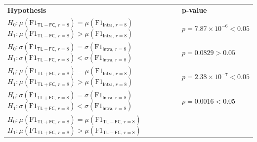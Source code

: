 \begin{table}[t]
\begin{tabularx}{\linewidth}{|X|l|}
  \Xhline{2\arrayrulewidth}
  \textbf{Hypothesis} & \textbf{p-value} \\
  \Xhline{1\arrayrulewidth}
  \( H_0: \mu\left(\text{F1}_{\mathsf{TL{-}FC},\, r=8}\right) = \mu\left(\text{F1}_{\mathsf{Intra},\, r=8}\right) \) \newline
  \( H_1: \mu\left(\text{F1}_{\mathsf{TL{-}FC},\, r=8}\right) > \mu\left(\text{F1}_{\mathsf{Intra},\, r=8}\right) \)
  & $p = 7.87 \times 10^{-6} < 0.05$ \\
  \hline
  \( H_0: \sigma\left(\text{F1}_{\mathsf{TL{-}FC},\, r=8}\right) = \sigma\left(\text{F1}_{\mathsf{Intra},\, r=8}\right) \) \newline
  \( H_1: \sigma\left(\text{F1}_{\mathsf{TL{-}FC},\, r=8}\right) < \sigma\left(\text{F1}_{\mathsf{Intra},\, r=8}\right) \)
  & $p = 0.0829 > 0.05$ \\
  \Xhline{1.8\arrayrulewidth}
  \( H_0: \mu\left(\text{F1}_{\mathsf{TL{+}FC},\, r=8}\right) = \mu\left(\text{F1}_{\mathsf{Intra},\, r=8}\right) \) \newline
  \( H_1: \mu\left(\text{F1}_{\mathsf{TL{+}FC},\, r=8}\right) > \mu\left(\text{F1}_{\mathsf{Intra},\, r=8}\right) \)
  & $p = 2.38 \times 10^{-7} < 0.05$ \\
  \hline
  \( H_0: \sigma\left(\text{F1}_{\mathsf{TL{+}FC},\, r=8}\right) = \sigma\left(\text{F1}_{\mathsf{Intra},\, r=8}\right) \) \newline
  \( H_1: \sigma\left(\text{F1}_{\mathsf{TL{+}FC},\, r=8}\right) < \sigma\left(\text{F1}_{\mathsf{Intra},\, r=8}\right) \)
  & $p = 0.0016 < 0.05$ \\
  \Xhline{1.8\arrayrulewidth}
  \( H_0: \mu\left(\text{F1}_{\mathsf{TL{+}FC},\, r=8}\right) = \mu\left(\text{F1}_{\mathsf{TL{-}FC},\, r=8}\right) \) \newline
  \( H_1: \mu\left(\text{F1}_{\mathsf{TL{+}FC},\, r=8}\right) > \mu\left(\text{F1}_{\mathsf{TL{-}FC},\, r=8}\right) \)

\end{tabularx}
\end{table}
